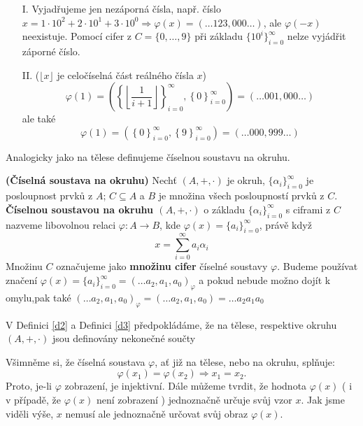 \documentclass[czech,bachelor,dept470,male]{diploma}
\newcommand{\poslalpha}{\{\alpha_i\}_{i=0}^{\infty}}
\begin{document}
\newpage
\begin{enumerate}
	\item[I.] Vyjadřujeme jen nezáporná čísla, např. číslo $x = 1\cdot10^2 + 2\cdot10^1 + 3\cdot10^0 \Rightarrow \varphi(x) = (\dots123,000\dots)$, ale $\varphi(-x)$ neexistuje. Pomocí cifer z $C=\{0,\dots,9\}$ při základu $\{10^i\}_{i=0}^{\infty}$ nelze vyjádřit záporné číslo.
	\item[II.] ($\lfloor x\rfloor$ je celočíselná část reálného čísla $x$)
	      $$\varphi(1) = \left( \left\{ \left\lfloor\frac{1}{i+1} \right\rfloor \right\}_{i = 0}^{\infty} , \left\{ 0 \right\}_{i = 0}^{\infty} \right) = \left(\dots 001,000 \dots \right)$$
	      ale také
	      $$\varphi(1) = \left( \left\{ 0 \right\}_{i = 0}^{\infty} , \left\{ 9 \right\}_{i = 0}^{\infty} \right) = \left(\dots 000,999 \dots \right)$$
\end{enumerate}
Analogicky jako na tělese definujeme číselnou soustavu na okruhu.
\begin{definition}\label{d3} \textbf{(Číselná soustava na okruhu)}
	Nechť $(A,+,\cdot)$ je okruh, $\poslalpha$ je posloupnost prvků z $A$; $C\subseteq A$ a $B$ je množina všech posloupností prvků z $C$.
	\newline\textbf{Číselnou soustavou na okruhu $(A,+,\cdot)$} o základu $\poslalpha$ s ciframi z $C$ nazveme libovolnou relaci $\varphi : A \rightarrow B$, kde $\varphi(x)= \{a_{i}\}_{i=0}^{\infty}$, právě když
	$$x = \sum_{i=0}^{\infty} a_{i}\alpha_{i}$$
	Množinu $C$ označujeme jako \textbf{množinu cifer} číselné soustavy $\varphi$. Budeme používat značení $\varphi(x) = \{a_{i}\}_{i=0}^{\infty} = (\dots a_2,a_1,a_0)_{\varphi}$ a pokud nebude možno dojít k omylu,\newline pak také $(\dots a_2,a_1,a_0)_{\varphi} = (\dots a_2,a_1,a_0) = \dots a_2a_1a_0$
\end{definition}
\begin{remark}
	V Definici \ref{d2} a Definici \ref{d3} předpokládáme, že na tělese, respektive okruhu $(A,+,\cdot)$ jsou definovány nekonečné součty
\end{remark}
\begin{remark}
	Všimněme si, že číselná soustava $\varphi$, ať již na tělese, nebo na okruhu, splňuje:
	$$\varphi (x_1) = \varphi(x_2) \Rightarrow x_1 = x_2.$$
	Proto, je-li $\varphi$ zobrazení, je injektivní.
	Dále můžeme tvrdit, že hodnota $\varphi(x)$ ( i v případě, že $\varphi(x)$ není zobrazení ) jednoznačně určuje svůj vzor $x$. Jak jsme viděli výše, $x$ nemusí ale jednoznačně určovat svůj obraz $\varphi(x)$.
\end{remark}
\end{document}
